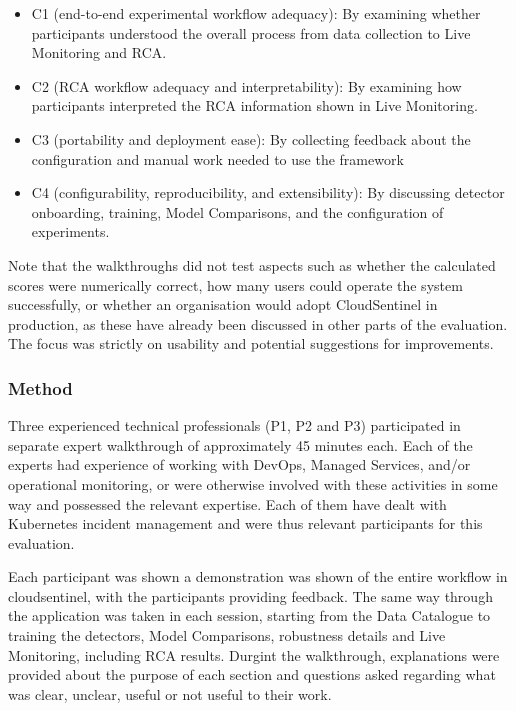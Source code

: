 \begin{itemize}
    \item C1 (end-to-end experimental workflow adequacy): By examining whether participants understood the overall process from data collection to Live Monitoring and RCA.
    \item C2 (RCA workflow adequacy and interpretability): By examining how participants interpreted the RCA information shown in Live Monitoring.
    \item C3 (portability and deployment ease): By collecting feedback about the configuration and manual work needed to use the framework
    \item C4 (configurability, reproducibility, and extensibility): By discussing detector onboarding, training, Model Comparisons, and the configuration of experiments.
\end{itemize}

Note that the walkthroughs did not test aspects such as whether the calculated scores were numerically correct, how many users could operate the system successfully, or whether an organisation would adopt CloudSentinel in production, as these have already been discussed in other parts of the evaluation. The focus was strictly on usability and potential suggestions for improvements.

\subsubsection{Method}

Three experienced technical professionals (P1, P2 and P3) participated in separate expert walkthrough of approximately 45 minutes each. Each of the experts had experience of working with DevOps, Managed Services, and/or operational monitoring, or were otherwise involved with these activities in some way and possessed the relevant expertise. Each of them have dealt with Kubernetes incident management and were thus relevant participants for this evaluation.

Each participant was shown a demonstration was shown of the entire workflow in cloudsentinel, with the participants providing feedback. The same way through the application was taken in each session, starting from the Data Catalogue to training the detectors, Model Comparisons, robustness details and Live Monitoring, including RCA results. Durgint the walkthrough, explanations were provided about the purpose of each section and questions asked regarding what was clear, unclear, useful or not useful to their work.

